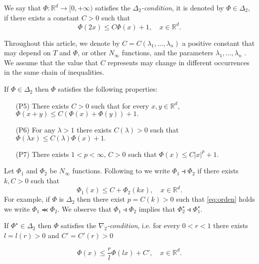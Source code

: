 \documentclass[twoside]{article}
\makeatletter
\theoremstyle{remark}
\newcounter{example}[section]
\def\namedlabel#1#2{\begingroup
    #2%
    \def\@currentlabel{#2}%
    \phantomsection\label{#1}\endgroup
}
\newcommand{\rr}{\mathbb{R}}
\renewcommand{\leq}{\leqslant}
\makeatother
\begin{document}
We say that  $\Phi:\mathbb{R}^d\rightarrow [0,+\infty)$ satisfies the  \emph{$\Delta_2$-condition}, it is denoted by $\Phi \in \Delta_2$,
if there exists a  constant $C>0$  such that
\begin{equation}\label{delta2defi}\Phi(2x)\leq C \Phi(x)+1,\quad x\in\rr^d.
\end{equation}


Throughout this article, we denote by $C=C(\lambda_1,\ldots,\lambda_n)$ a positive constant that may depend on $T$ and $\Phi$,  or other $N_{\infty}$ functions, and the parameters $\lambda_1,\ldots,\lambda_n$ . We assume that the value that $C$ represents may change in 
different occurrences in the same chain of inequalities. 




If $\Phi\in\Delta_2$ then $\Phi$ satisfies the following properties:
\begin{enumerate}
 \item[\namedlabel{eq:quasi-sub-aditividad}{(P5)}] There exists $C>0$ such that for every $x,y\in \rr^d$, $\Phi(x+y)\leq C (\Phi(x)+\Phi(y))+1.$
\item[\namedlabel{{eq:delta2-lambda}}{(P6)}]  For any $\lambda>1$ there exists $C(\lambda)>0$ such that $\Phi(\lambda x)\leq C(\lambda)\Phi(x)+1.$
\item [\namedlabel{{eq:delta2-power}}{(P7)}] There exists $1<p<\infty$, $C>0$ such that $\Phi(x)\leq C|x|^p+1$.

\end{enumerate}


Let $\Phi_1$ and $\Phi_2$ be   $N_{\infty}$ functions. Following to \cite{trudinger1974imbedding} we write $\Phi_1\strictif\Phi_2$ if there exists  $k,C>0$ such that
\begin{equation}\label{eq:orden} \Phi_1(x)\leq C+\Phi_2(kx),\quad x\in\rr^d.\end{equation}
For example, if $\Phi$ is $\Delta_2$ then there exist $p =C(k)>0$ such that \eqref{eq:orden} holds we write  $\Phi_1\llcurly\Phi_2$.  We observe that  $\Phi_1\strictif \Phi_2$ implies that $\Phi^{\star}_2\strictif\Phi^{\star}_1$. 



If $\Phi^{\star}\in\Delta_2$ then $\Phi$ satisfies the \emph{$\nabla_2$-condition}, i.e.  for every $0<r<1$ there exists $l=l(r)>0$ and $C'=C'(r)>0$ 

\begin{equation}\label{eq:nabla2}
  \Phi(x)\leq \frac{r}{l}\Phi(l x)+C',\quad x\in\rr^d.
\end{equation}
\end{document}
